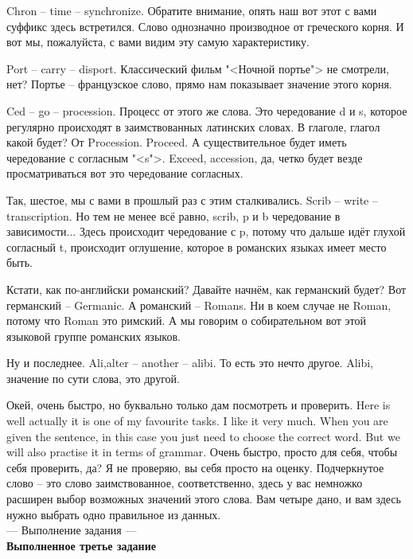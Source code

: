 \documentclass[main.tex]{subfiles}
\begin{document}
Chron -- time -- synchronize.
Обратите внимание, опять наш вот этот с вами суффикс здесь встретился.
Слово однозначно производное от греческого корня.
И вот мы, пожалуйста, с вами видим эту самую характеристику.

Port -- carry -- disport.
Классический фильм "<Ночной портье"> не смотрели, нет?
Портье -- французское слово, прямо нам показывает значение этого корня.

Ced -- go -- procession.
Процесс от этого же слова.
Это чередование d и s, которое регулярно происходят в заимствованных латинских словах.
В глаголе, глагол какой будет? От Procession.
Proceed.
А существительное будет иметь чередование с согласным "<s">.
Exceed, accession, да, четко будет везде просматриваться вот это чередование согласных.


Так, шестое, мы с вами в прошлый раз с этим сталкивались.
Scrib -- write -- transcription.
Но тем не менее всё равно, scrib, p и b чередование в зависимости...
Здесь происходит чередование с p, потому что дальше идёт глухой согласный t, происходит оглушение, которое в романских языках имеет место быть.

Кстати, как по-английски романский?
Давайте начнём, как германский будет?
Вот германский -- Germanic.
А романский -- Romans.
Ни в коем случае не Roman, потому что Roman это римский.
А мы говорим о собирательном вот этой языковой группе романских языков.

Ну и последнее.
Ali,alter -- another -- alibi.
То есть это нечто другое.
Alibi, значение по сути слова, это другой.


Окей, очень быстро, но буквально только дам посмотреть и проверить.
Here is well actually it is one of my favourite tasks.
I like it very much.
When you are given the sentence, in this case you just need to choose the correct word.
But we will also practise it in terms of grammar.
Очень быстро, просто для себя, чтобы себя проверить, да?
Я не проверяю, вы себя просто на оценку.
Подчеркнутое слово -- это слово заимствованное, соответственно, здесь у вас немножко расширен выбор возможных значений этого слова.
Вам четыре дано, и вам здесь нужно выбрать одно правильное из данных.
\\

--- Выполнение задания ---
\\

\textbf{Выполненное третье задание}
\end{document}
